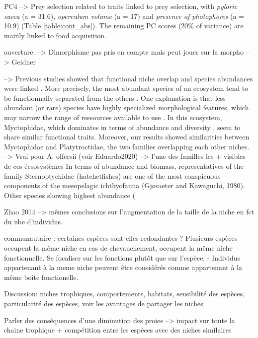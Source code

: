 PC4 --> Prey selection
 related to traits linked to prey selection, with \emph{pyloric caeca} (a = 31.6), \emph{operculum volume} (a = 17) and \emph{presence of photophores} (a = 10.9) (Table \ref{table:cont_abs}). The remaining PC scores (20\% of variance) are mainly linked to food acquisition. 

ouverture:
 --> Dimorphisme pas pris en compte mais peut jouer sur la morpho --> Geidner 

 --> Previous studies showed that functional niche overlap and species abundances were linked \citep{aneeshkumar2017,mason2008}. More precisely, the most abundant species of an ecosystem tend to be functionnally separated from the others \citep{farre2016}. One explanation is that less-abundant (or rare) species have highly specialized morphological features, which may narrow the range of ressources available to use \citep{aneeshkumar2017}. In this ecosystem, Myctophidae, which dominates in terms of abundance and diversity \citep{catul2011,garcia2021}, seem to share similar functional traits. Moreover, our results showed similarities between Myctophidae and Platytroctidae, the two families overlapping each other niches. --> Vrai pour A. olfersii (voir Eduardo2020) --> l'une des familles les + visibles de ces écsosystèmes
In terms of abundance and biomass, representatives of the family
Sternoptychidae (hatchetfishes) are one of the most conspicuous components
of the mesopelagic ichthyofauna (Gjøsaeter and Kawaguchi,
1980).
Other species showing highest abundance (%
\citep{sutton2008}



Zhao 2014 --> mêmes conclusions sur l'augmentation de la taille de la niche en fct du nbe d'individus.

communautaire : certaines espèces sont-elles redondantes ? Plusieurs espèces
occupent la même niche en cas de chevauchement, occupent la même niche fonctionnelle. Se focaliser
sur les fonctions plutôt que sur l'espèce. 
		- Individus appartenant à la meme niche peuvent être considérés comme appartenant
à la même boîte fonctionelle. 


Discussion: niches trophiques, comportements, habitats, sensibilité des espèces, 
particularité des espèces, voir les avantages de partager les niches 


Parler des conséquences d'une diminution des proies --> impact sur toute la chaine trophique + compétition entre les espèces avec des niches similaires 
